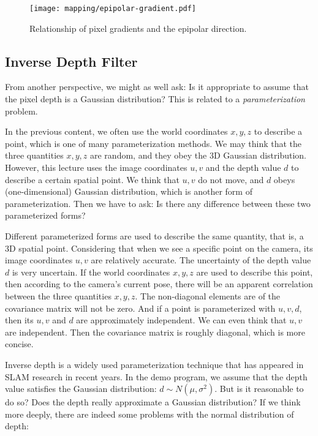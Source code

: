 \begin{figure}[!htp]
	\centering
	\texttt{[image: mapping/epipolar-gradient.pdf]}
	\caption{Relationship of pixel gradients and the epipolar direction.}
	\label{fig:epipolar-gradient}
\end{figure}

\subsection{Inverse Depth Filter}
From another perspective, we might as well ask: Is it appropriate to assume that the pixel depth is a Gaussian distribution? This is related to a \textit{parameterization} problem.

In the previous content, we often use the world coordinates $x, y, z$ to describe a point, which is one of many parameterization methods. We may think that the three quantities $x, y, z$ are random, and they obey the 3D Gaussian distribution. However, this lecture uses the image coordinates $u,v$ and the depth value $d$ to describe a certain spatial point. We think that $u,v$ do not move, and $d$ obeys (one-dimensional) Gaussian distribution, which is another form of parameterization. Then we have to ask: Is there any difference between these two parameterized forms?

Different parameterized forms are used to describe the same quantity, that is, a 3D spatial point. Considering that when we see a specific point on the camera, its image coordinates $u,v$ are relatively accurate. The uncertainty of the depth value $d$ is very uncertain. If the world coordinates $x,y,z$ are used to describe this point, then according to the camera's current pose, there will be an apparent correlation between the three quantities $x,y,z$. The non-diagonal elements are of the covariance matrix will not be zero. And if a point is parameterized with $u, v, d$, then its $u, v$ and $d$ are approximately independent. We can even think that $u, v$ are independent. Then the covariance matrix is roughly diagonal, which is more concise.

Inverse depth is a widely used parameterization technique {\cite{Montiel2006, Civera2008}} that has appeared in SLAM research in recent years. In the demo program, we assume that the depth value satisfies the Gaussian distribution: $d \sim N(\mu, \sigma^2)$. But is it reasonable to do so? Does the depth really approximate a Gaussian distribution? If we think more deeply, there are indeed some problems with the normal distribution of depth:

